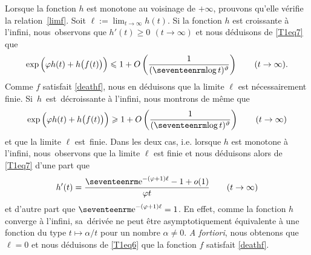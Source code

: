 Lorsque la fonction $h$ est monotone au voisinage de $+\infty$, prouvons qu'elle v\'erifie la relation~\eqref{limf}. 
Soit $\ell:=\lim_{t\to\infty}h(t)$. Si la fonction $h$ est croissante \`a l'infini, 
nous~observons que $h'(t)\ge0\ \,(t\to\infty)$ 
et nous d\'eduisons de \eqref{T1eq7} que   
$$
\exp\B(\varphi h(t)+h\b(f(t)\b)\B)\le1+O\Q({1\F(\log t)^\theta}\W)
\qquad(t\to\infty).
$$
Comme $f$ satisfait \eqref{deathf}, nous en d\'eduisons que la limite $\ell$ est n\'ecessairement finie.  
Si~$h$~est~d\'ecroissante \`a l'infini, nous montrons de m\^eme que 
$$
\exp\B(\varphi h(t)+h\b(f(t)\b)\B)\ge1+O\Q({1\F(\log t)^\theta}\W)
\qquad(t\to\infty)
$$
et que la limite $\ell$ est~finie. Dans les deux cas, i.e. lorsque $h$ est monotone \`a l'infini, 
nous~observons que la limite $\ell$ est finie et nous d\'eduisons alors de \eqref{T1eq7} d'une part que 
$$
h'(t)={\e^{-(\varphi+1)\ell}-1+o(1)\F\varphi t}
\qquad(t\to\infty)
$$
et d'autre part que $\e^{-(\varphi+1)\ell}=1$. En effet, 
comme la fonction $h$ converge \`a l'infini, sa~d\'eriv\'ee ne peut \^etre asymptotiquement \'equivalente  
\`a une fonction du type $t\mapsto \alpha/t$ pour un nombre $\alpha\neq0$. 
{\it A fortiori}, nous obtenons que $\ell=0$ et nous d\'eduisons de \eqref{T1eq6} que la fonction $f$ satisfait \eqref{deathf}. 
\bigskip






